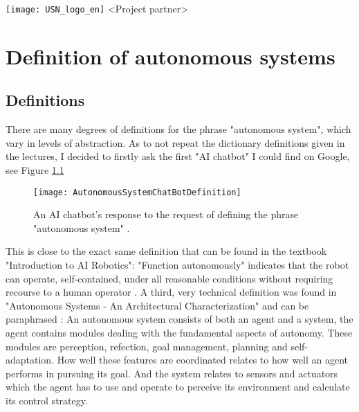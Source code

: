 \documentclass[%
oneside,    %
project,    %
nosummary   %
]{USN-MSc}
\newcommand{\myauthor}{%
223786 Lars Rikard Rådstoga
}
\newcommand{\myparticipants}{
<First participant>\\
<Second participant>\\
<Third participant>\\
<Fourth participant>
}
\begin{document}
\USNtitlepage%
{%
  {}
   \texttt{[image: USN\_logo\_en]}}
{<Project partner>}
{%
\lipsum[6-7]
}





\tableofcontents
{}





\chapter{Definition of autonomous systems}
\label{ch:definition}
\lipsum[4]
\section{Definitions}
There are many degrees of definitions for the phrase "autonomous system", which vary in levels of abstraction. 
As to not repeat the dictionary definitions given in the lectures, I decided to firstly ask the first "AI chatbot" I could find on Google, see Figure \ref{fig:chat-bot}
\begin{figure}[!ht]
  \centering
  \texttt{[image: AutonomousSystemChatBotDefinition]}
  \caption{An AI chatbot's response to the request of defining the phrase "autonomous system" \cite{ChaiChat90:online}.}
  \label{fig:chat-bot}
\end{figure}
This is close to the exact same definition that can be found in the textbook "Introduction to AI Robotics":
"Function autonomously" indicates that the robot can operate, self-contained, under all reasonable conditions without requiring recourse to a human operator \cite{murphy2000introduction}.
A third, very technical definition was found in "Autonomous Systems - An Architectural Characterization" and can be paraphrased \cite{Sifakis}:
An autonomous system consists of both an agent and a system, the agent contains modules dealing with the fundamental aspects of autonomy.
These modules are perception, refection, goal management, planning and self-adaptation. How well these features are coordinated relates to how well an agent performs in pursuing its goal.
And the system relates to sensors and actuators which the agent has to use and operate to perceive its environment and calculate its control strategy.
\end{document}
